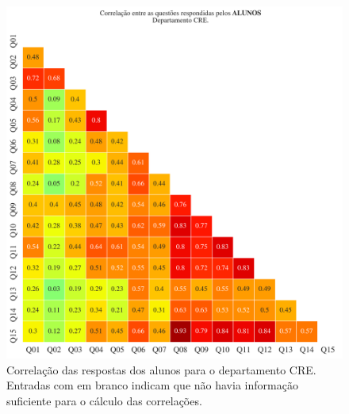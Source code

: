 \documentclass[a4paper,10pt]{article}
\begin{document}
\begin{figure}[h]
\centering
\includegraphics[width=0.999\linewidth]{matriz_corr__CRE_alunos.png}
\caption{\label{fig:corr_alunos}Correlação das respostas dos alunos para o departamento CRE. Entradas com em branco indicam que não havia informação suficiente para o cálculo das correlações.}
\end{figure}
\end{document}
